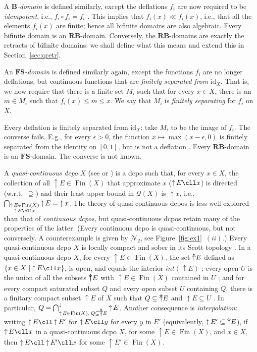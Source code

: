 \documentclass{LMCS}
\newcommand\Smyth{\mathcal Q}
\newcommand\upc{\mathop{\uparrow}\nolimits}
\newcommand\uuarrow{\rlap{$\uparrow$}\raise.5ex\hbox{$\uparrow$}}\newcommand\ddarrow{\rlap{$\downarrow$}\raise.5ex\hbox{$\downarrow$}}\newcommand\Fin{\mathop{\text{Fin}}}
\newcommand{\interior}[1]{int ({#1})} \newcommand{\biginterior}[1]{\interior{#1}}
\newcommand\B{\mathbf{B}}
\newcommand\RB{\mathbf{RB}}
\newcommand\FS{\mathbf{FS}}
\newcommand{\identity}[1]{\mathrm{id}_{#1}}
\begin{document}
A {\em $\B$-domain\/} is defined similarly, except the deflations
$f_i$ are now required to be {\em idempotent\/}, i.e., $f_i \circ f_i
= f_i$ \cite[Theorem~4.2.6]{AJ:domains}.  This implies that $f_i (x)
\ll f_i (x)$, i.e., that all the elements $f_i (x)$ are finite; hence
all bifinite domains are also algebraic.  Every bifinite domain is an
$\RB$-domain.  Conversely, the $\RB$-domains are exactly the retracts
of bifinite domains: we shall define what this means and extend this
in Section~\ref{sec:qretr}.

An {\em $\FS$-domain\/} is defined similarly again, except the
functions $f_i$ are no longer deflations, but continuous functions
that are {\em finitely separated from $\identity X$\/}.  That is, we
now require that there is a finite set $M_i$ such that for every $x
\in X$, there is an $m \in M_i$ such that $f_i (x) \leq m \leq x$.  We
say that $M_i$ is {\em finitely separating\/} for $f_i$ on $X$.

Every deflation is finitely separated from $\identity X$: take $M_i$
to be the image of $f_i$.  The converse fails.  E.g., for every
$\epsilon > 0$, the function $x \mapsto \max (x - \epsilon, 0)$ is
finitely separated from the identity on $[0,1]$, but is not a
deflation \cite[Section~3.2]{JT:troublesome}.  Every $\RB$-domain is
an $\FS$-domain.  The converse is not known.

A {\em quasi-continuous dcpo\/} $X$ (see \cite{GLS:quasicont} or
\cite[Definition~III-3.2]{GHKLMS:contlatt}) is a dcpo such that, for
every $x \in X$, the collection of all $\upc E \in \Fin (X)$ that
approximate $x$ ($\upc E \cll x$) is directed (w.r.t.\ $\supseteq$)
and their least upper bound in $\Smyth (X)$ is $\upc x$, i.e.,
$\bigcap_{\substack{\upc E \in \Fin (X)\\ \upc E \cll x}} \upc E =
\upc x$.  The theory of quasi-continuous dcpos is less well explored than that
of {\em continuous dcpos\/}, but quasi-continuous dcpos retain many of
the properties of the latter.  (Every continuous dcpo is
quasi-continuous, but not conversely.  A counterexample is given by
$\mathcal N_2$, see Figure~\ref{fig:ex1}~$(ii)$.)
Every quasi-continuous dcpo $X$ is locally compact and sober in its
Scott topology \cite[III-3.7]{GHKLMS:contlatt}.  In a quasi-continuous
dcpo $X$, for every $\upc E \in \Fin (X)$, the set $\uuarrow E$
defined as $\{x \in X \mid \upc E \cll x\}$, is open, and equals the
interior $\interior {\upc E}$ \cite[III-3.6(ii)]{GHKLMS:contlatt};
every open $U$ is the union of all the subsets $\uuarrow E$ with $\upc
E \in \Fin (X)$ contained in $U$ \cite[III-5.6]{GHKLMS:contlatt}; and
for every compact saturated subset $Q$ and every open subset $U$
containing $Q$, there is a finitary compact subset $\upc E$ of $X$
such that $Q \subseteq \uuarrow E$ and $\upc E \subseteq U$
\cite[III-5.7]{GHKLMS:contlatt}.
In particular, $Q = \bigcap_{\upc E \in \Fin (X),\: Q \subseteq \uuarrow
  E}^\downarrow \upc E$.  Another consequence is {\em
  interpolation\/}: writing $\upc E \cll \upc E'$ for $\upc E \cll y$
for every $y$ in $E'$ (equivalently, $\upc E' \subseteq \uuarrow E$),
if $\upc E \cll x$ in a quasi-continuous dcpo $X$, for some $\upc E
\in \Fin (X)$, and $x \in X$, then $\upc E \cll \upc E' \cll x$ for
some $\upc E' \in \Fin (X)$.
\end{document}
